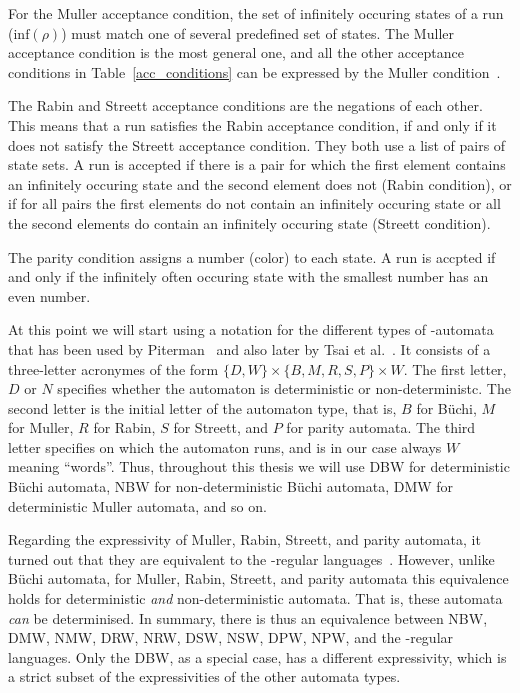 For the Muller acceptance condition, the set of infinitely occuring states of a run ($\textrm{inf}(\rho)$) must match one of several predefined set of states. The Muller acceptance condition is the most general one, and all the other acceptance conditions in Table~\ref{acc_conditions} can be expressed by the Muller condition~\cite{1999_loeding}.

The Rabin and Streett acceptance conditions are the negations of each other. This means that a run satisfies the Rabin acceptance condition, if and only if it does not satisfy the Streett acceptance condition. They both use a list of pairs of state sets. A run is accepted if there is a pair for which the first element contains an infinitely occuring state and the second element does not (Rabin condition), or if for all pairs the first elements do not contain an infinitely occuring state or all the second elements do contain an infinitely occuring state (Streett condition).

The parity condition assigns a number (color) to each state. A run is accpted if and only if the infinitely often occuring state with the smallest number has an even number.

At this point we will start using a notation for the different types of \om-automata that has been used by Piterman~\cite{2006_piterman} and also later by Tsai et al.~\cite{2011_tsai}. It consists of a three-letter acronymes of the form $\{D, W\} \times \{B, M, R, S, P\} \times W$. The first letter, $D$ or $N$ specifies whether the automaton is deterministic or non-deterministc. The second letter is the initial letter of the automaton type, that is, $B$ for Büchi, $M$ for Muller, $R$ for Rabin, $S$ for Streett, and $P$ for parity automata. The third letter specifies on which the automaton runs, and is in our case always $W$ meaning ``words''. Thus, throughout this thesis we will use DBW for deterministic Büchi automata, NBW for non-deterministic Büchi automata, DMW for deterministic Muller automata, and so on.

Regarding the expressivity of Muller, Rabin, Streett, and parity automata, it turned out that they are equivalent to the \om-regular languages~\cite{Thomas:1991}. However, unlike Büchi automata, for Muller, Rabin, Streett, and parity automata this equivalence holds for deterministic \textit{and} non-deterministic automata. That is, these automata \textit{can} be determinised. In summary, there is thus an equivalence between NBW, DMW, NMW, DRW, NRW, DSW, NSW, DPW, NPW, and the \om-regular languages. Only the DBW, as a special case, has a different expressivity, which is a strict subset of the expressivities of the other automata types. 




